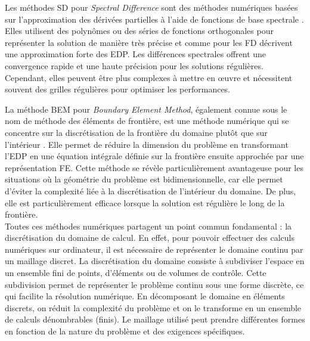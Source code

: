 Les méthodes SD pour \emph{Spectral Difference} sont des méthodes numériques basées sur l'approximation des dérivées partielles à l'aide de fonctions de base spectrale \cite{liu2006spectral, van2008stability}. Elles utilisent des polynômes ou des séries de fonctions orthogonales pour représenter la solution de manière très précise et comme pour les FD décrivent une approximation forte des EDP. Les différences spectrales offrent une convergence rapide et une haute précision pour les solutions régulières. Cependant, elles peuvent être plus complexes à mettre en œuvre et nécessitent souvent des grilles régulières pour optimiser les performances.


La méthode BEM pour \emph{Boundary Element Method}, également connue sous le nom de méthode des éléments de frontière, est une méthode numérique qui se concentre sur la discrétisation de la frontière du domaine plutôt que sur l'intérieur \cite{nedelec2001acoustic, wu2002boundary, kirkup2019boundary}. Elle permet de réduire la dimension du problème en transformant l'EDP en une équation intégrale définie sur la frontière ensuite approchée par une représentation FE. Cette méthode se révèle particulièrement avantageuse pour les situations où la géométrie du problème est bidimensionnelle, car elle permet d'éviter la complexité liée à la discrétisation de l'intérieur du domaine. De plus, elle est particulièrement efficace lorsque la solution est régulière le long de la frontière.\\

Toutes ces méthodes numériques partagent un point commun fondamental : la discrétisation du domaine de calcul. En effet, pour pouvoir effectuer des calculs numériques sur ordinateur, il est nécessaire de représenter le domaine continu par un maillage discret. La discrétisation du domaine consiste à subdiviser l'espace en un ensemble fini de points, d'éléments ou de volumes de contrôle. Cette subdivision permet de représenter le problème continu sous une forme discrète, ce qui facilite la résolution numérique. En décomposant le domaine en éléments discrets, on réduit la complexité du problème et on le transforme en un ensemble de calculs dénombrables (finis). Le maillage utilisé peut prendre différentes formes en fonction de la nature du problème et des exigences spécifiques.


